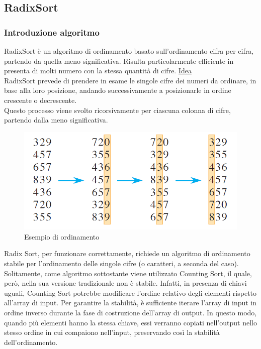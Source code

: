 \documentclass[a4paper, 11pt]{article}
\begin{document}
\subsection{RadixSort}
\subsubsection*{Introduzione algoritmo}
RadixSort è un algoritmo di ordinamento basato sull'ordinamento cifra per cifra, partendo da quella meno significativa. Risulta particolarmente efficiente in presenta di molti numero con la stessa quantità di cifre.\bigbreak
\noindent \underline{Idea}\\
RadixSort prevede di prendere in esame le singole cifre dei numeri da ordinare, in base alla loro posizione, andando successivamente a posizionarle in ordine crescente o decrescente.\\
Questo processo viene svolto ricorsivamente per ciascuna colonna di cifre, partendo dalla meno significativa.

\begin{figure}[H]
    \centering
    \includegraphics[scale=0.5]{./Immagini/RadixSort.png}
    \caption*{Esempio di ordinamento}
\end{figure}

\noindent Radix Sort, per funzionare correttamente, richiede un algoritmo di ordinamento stabile per l'ordinamento delle singole cifre (o caratteri, a seconda del caso).\bigbreak
\noindent Solitamente, come algoritmo sottostante viene utilizzato Counting Sort, il quale, però, nella sua versione tradizionale non è stabile. Infatti, in presenza di chiavi uguali, Counting Sort potrebbe modificare l'ordine relativo degli elementi rispetto all'array di input.\bigbreak
\noindent Per garantire la stabilità, è sufficiente iterare l'array di input in ordine inverso durante la fase di costruzione dell'array di output. In questo modo, quando più elementi hanno la stessa chiave, essi verranno copiati nell'output nello stesso ordine in cui compaiono nell'input, preservando così la stabilità dell'ordinamento.
\end{document}
